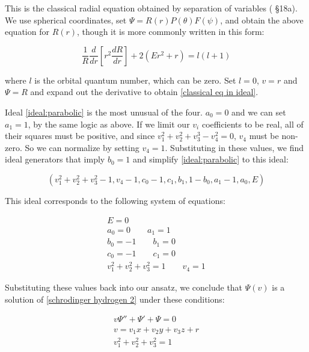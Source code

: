 \documentclass{article}
\theoremstyle{definition}
\theoremstyle{plain}
\begin{document}
This is the classical radial equation obtained by separation of variables (\cite{pauling and wilson} \S18a).
We use spherical coordinates, set $\Psi = R(r)P(\theta)F(\psi)$, and obtain the above equation for $R(r)$,
though it is more commonly written in this form:

\begin{equation}
\frac{1}{R} \frac{d}{dr}\left[ r^2 \frac{dR}{dr}\right] + 2(Er^2 + r) = l(l+1)
\end{equation}

where $l$ is the orbital quantum number, which can be zero.  Set $l=0$, $v=r$ and $\Psi=R$ and
expand out the derivative to obtain \eqref{classical eq in ideal}.

Ideal \eqref{ideal:parabolic} is the most unusual of the four.
$a_0=0$ and we can set $a_1=1$, by the same logic as above.
If we limit our $v_i$ coefficients to be real, all of their squares must
be positive, and since $v_1^2+v_2^2+v_3^3-v_4^2=0$, $v_4$ must be non-zero.  So we can normalize by setting $v_4=1$.
Substituting in these values, we find ideal generators that imply $b_0=1$ and simplify \eqref{ideal:parabolic} to this ideal:

\begin{equation}
\left(v_{1}^{2} + v_{2}^{2} + v_{3}^{2} - 1, v_{4} - 1, c_{0} - 1, c_{1}, b_{1}, 1 - b_{0}, a_1 - 1, a_{0}, E\right)
\end{equation}

This ideal corresponds to the following system of equations:

\begin{equation}
\begin{gathered}
E = 0 \\
a_0 = 0 \qquad
a_1 = 1 \\
b_0 = -1 \qquad
b_1 = 0 \\
c_0 = -1 \qquad
c_1 = 0 \\
v_1^2 + v_2^2 + v_3^2 = 1 \qquad
v_4 = 1
\end{gathered}
\end{equation}

Substituting these values back into our ansatz, we conclude that $\Psi(v)$
is a solution of \eqref{schrodinger hydrogen 2} under these conditions:

\begin{equation}
\label{related solution}
\begin{gathered}
v \Psi'' + \Psi' + \Psi = 0 \\
v = v_1 x+ v_2 y+ v_3 z+r \\
v_1^2 + v_2^2 + v_3^2 = 1
\end{gathered}
\end{equation}
\end{document}

